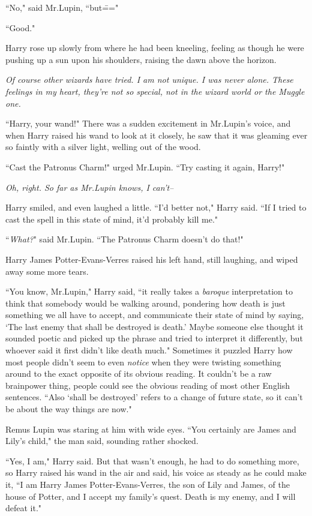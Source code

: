 ``No," said Mr.\?Lupin, ``but\==="

``Good."

Harry rose up slowly from where he had been kneeling, feeling as though he were pushing up a sun upon his shoulders, raising the dawn above the horizon.

\emph{Of \emph{course} other wizards have tried. I am not unique. I was never alone. These feelings in my heart, they're not so special, not in the wizard world or the Muggle one.}

``Harry, your wand!" There was a sudden excitement in Mr.\?Lupin's voice, and when Harry raised his wand to look at it closely, he saw that it was gleaming ever so faintly with a silver light, welling out of the wood.

``Cast the Patronus Charm!" urged Mr.\?Lupin. ``Try casting it again, Harry!"

\emph{Oh, right. So far as Mr.\?Lupin knows, I can't\---}

Harry smiled, and even laughed a little. ``I'd better not," Harry said. ``If I tried to cast the spell in this state of mind, it'd probably kill me."

``\emph{What?}" said Mr.\?Lupin. ``The Patronus Charm doesn't do that!"

Harry James Potter-Evans-Verres raised his left hand, still laughing, and wiped away some more tears.

``You know, Mr.\?Lupin," Harry said, ``it really takes a \emph{baroque} interpretation to think that somebody would be walking around, pondering how death is just something we all have to accept, and communicate their state of mind by saying, `The last enemy that shall be destroyed is death.' Maybe someone else thought it sounded poetic and picked up the phrase and tried to interpret it differently, but whoever said it first didn't like death much." Sometimes it puzzled Harry how most people didn't seem to even \emph{notice} when they were twisting something around to the exact opposite of its obvious reading. It couldn't be a raw brainpower thing, people could see the obvious reading of most other English sentences. ``Also `shall be destroyed' refers to a change of future state, so it can't be about the way things are now."

Remus Lupin was staring at him with wide eyes. ``You certainly are James and Lily's child," the man said, sounding rather shocked.

``Yes, I am," Harry said. But that wasn't enough, he had to do something more, so Harry raised his wand in the air and said, his voice as steady as he could make it, ``I am Harry James Potter-Evans-Verres, the son of Lily and James, of the house of Potter, and I accept my family's quest. Death is my enemy, and I will defeat it."

